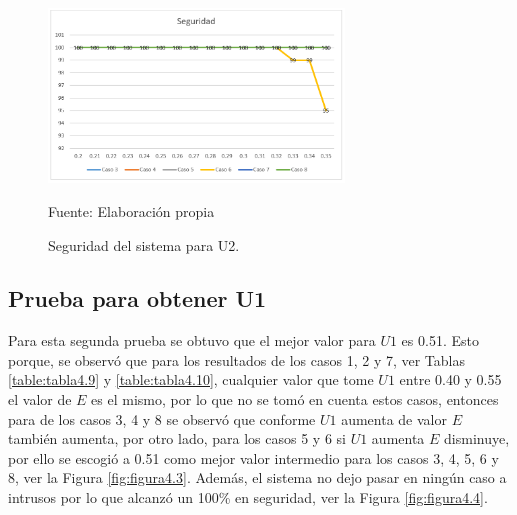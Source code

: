 \begin{figure}[H]
\begin{center}
\includegraphics[width=0.7\textwidth]{Imagenes/Cap4/image002}
\end{center}
\begin{center}
\vskip -0.5cm
\caption{\small{Seguridad del sistema para U2.}}
\label{fig:figura4.2}
{\small{Fuente: Elaboración propia}}
\end{center}
\end{figure}

\subsection{Prueba para obtener U1}
\par
Para esta segunda prueba se obtuvo que el mejor valor para $U1$ es 0.51. Esto porque, se observó que para los resultados de los casos 1, 2 y 7, ver Tablas \ref{table:tabla4.9} y \ref{table:tabla4.10}, cualquier valor que tome $U1$ entre 0.40 y 0.55 el valor de $E$ es el mismo, por lo que no se tomó en cuenta estos casos, entonces para de los casos 3, 4 y 8 se observó que conforme $U1$ aumenta de valor $E$ también aumenta, por otro lado, para los casos 5 y 6 si $U1$ aumenta $E$ disminuye, por ello se escogió a 0.51 como mejor valor intermedio para los casos 3, 4, 5, 6 y 8, ver la Figura \ref{fig:figura4.3}. Además, el sistema no dejo pasar en ningún caso a intrusos por lo que alcanzó un 100\% en seguridad, ver la Figura \ref{fig:figura4.4}.

